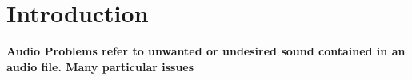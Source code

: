 \normallinespacing

\chapter{Introduction}

\bf Audio Problems \rm refer to unwanted or undesired sound contained in an audio file. Many particular issues 


